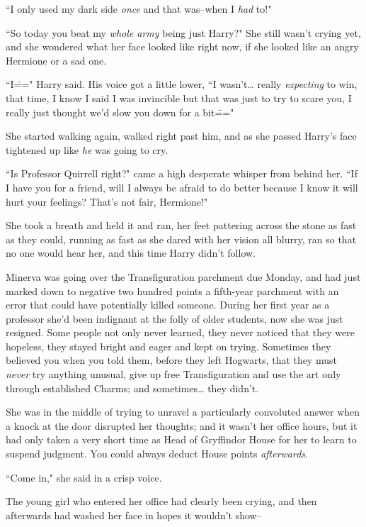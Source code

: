 ``I only used my dark side \emph{once} and that was\---when I \emph{had} to!"

``So today you beat my \emph{whole army} being just Harry?" She still wasn't crying yet, and she wondered what her face looked like right now, if she looked like an angry Hermione or a sad one.

``I\===" Harry said. His voice got a little lower, ``I wasn't{\ldots} really \emph{expecting} to win, that time, I know I said I was invincible but that was just to try to scare you, I really just thought we'd slow you down for a bit\==="

She started walking again, walked right past him, and as she passed Harry's face tightened up like \emph{he} was going to cry.

``Is Professor Quirrell right?" came a high desperate whisper from behind her. ``If I have you for a friend, will I always be afraid to do better because I know it will hurt your feelings? That's not fair, Hermione!"

She took a breath and held it and ran, her feet pattering across the stone as fast as they could, running as fast as she dared with her vision all blurry, ran so that no one would hear her, and this time Harry didn't follow.

\later

Minerva was going over the Transfiguration parchment due Monday, and had just marked down to negative two hundred points a fifth-year parchment with an error that could have potentially killed someone. During her first year as a professor she'd been indignant at the folly of older students, now she was just resigned. Some people not only never learned, they never noticed that they were hopeless, they stayed bright and eager and kept on trying. Sometimes they believed you when you told them, before they left Hogwarts, that they must \emph{never} try anything unusual, give up free Transfiguration and use the art only through established Charms; and sometimes{\ldots} they didn't.

She was in the middle of trying to unravel a particularly convoluted answer when a knock at the door disrupted her thoughts; and it wasn't her office hours, but it had only taken a very short time as Head of Gryffindor House for her to learn to suspend judgment. You could always deduct House points \emph{afterwards}.

``Come in," she said in a crisp voice.

The young girl who entered her office had clearly been crying, and then afterwards had washed her face in hopes it wouldn't show\---


